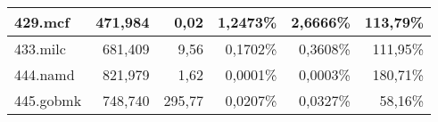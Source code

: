 \begin{table}[]
\begin{tabular}{|l|r|r|r|r|r|}
		429.mcf            & 471,984                                                                                                                      & 0,02                                                                                                                 & 1,2473\%                                                                                                                 & 2,6666\%                                                                                                                 & 113,79\%                                                                                                                            \\ \hline
		433.milc           & 681,409                                                                                                                      & 9,56                                                                                                                 & 0,1702\%                                                                                                                 & 0,3608\%                                                                                                                 & 111,95\%                                                                                                                            \\ \hline
		444.namd           & 821,979                                                                                                                      & 1,62                                                                                                                 & 0,0001\%                                                                                                                 & 0,0003\%                                                                                                                 & 180,71\%                                                                                                                            \\ \hline
		445.gobmk          & 748,740                                                                                                                      & 295,77                                                                                                               & 0,0207\%                                                                                                                 & 0,0327\%                                                                                                                 & 58,16\%                                                                                                                             \\ \hline

\end{tabular}
\end{table}
